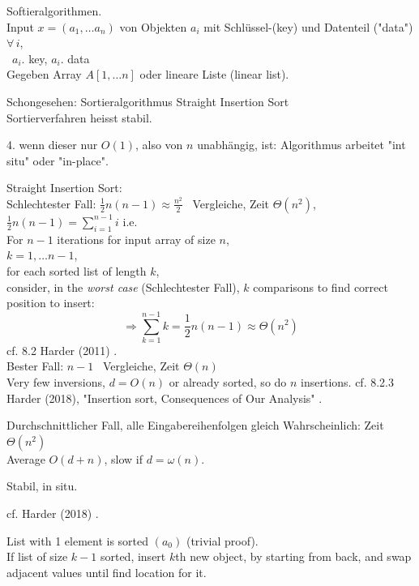 \documentclass[10pt]{amsart}
\begin{document}
\begin{multicols*}{2}
Softieralgorithmen. \\

Input $x = (a_1, \dots a_n)$ von Objekten $a_i$ mit Schl\"{u}ssel-(key) und Datenteil ("data") $\forall \, i$, \\
\quad \quad \, $a_i .$ key, $a_i . $ data \\

Gegeben Array $A[1,\dots n]$ oder lineare Liste (linear list).

Schongesehen: Sortieralgorithmus Straight Insertion Sort \\
Sortierverfahren heisst stabil.

4. wenn dieser nur $O(1)$, also von $n$ unabh\"{a}ngig, ist: Algorithmus arbeitet "int situ" oder "in-place".

Straight Insertion Sort: \\

Schlechtester Fall: $\frac{1}{2}n(n-1) \approx \frac{n^2}{2}$ \quad \, Vergleiche, Zeit $\Theta(n^2)$, \\
$\frac{1}{2} n (n-1) = \sum_{i=1}^{n-1} i $ i.e. \\

For $n-1$ iterations for input array of size $n$, \\
$k = 1, \dots n-1$, \\
for each sorted list of length $k$, \\
consider, in the \emph{worst case} (Schlechtester Fall), $k$ comparisons to find correct position to insert: 
\[
\Longrightarrow \sum_{k=1}^{n-1} k = \frac{1}{2} n ( n -1) \approx \Theta(n^2)
\]cf. 8.2 Harder (2011) \cite{Hard2018}. \\


Bester Fall: $n-1$ \, Vergleiche, Zeit $\Theta(n)$ \\ Very few inversions, $d= O(n)$ or already sorted, so do $n$ insertions. cf. 8.2.3 Harder (2018), "Insertion sort, Consequences of Our Analysis" \cite{Hard2018}. 

Durchschnittlicher Fall, alle Eingabereihenfolgen gleich Wahrscheinlich: Zeit $\Theta(n^2)$ \\

Average $O(d+n)$, slow if $d= \omega(n)$.

Stabil, in situ.

cf. Harder (2018) \cite{Hard2018}.

List with 1 element is sorted $(a_0)$ (trivial proof). \\

If list of size $k-1$ sorted, insert $k$th new object, by starting from back, and swap adjacent values until find location for it.


\end{multicols*}
\end{document}
